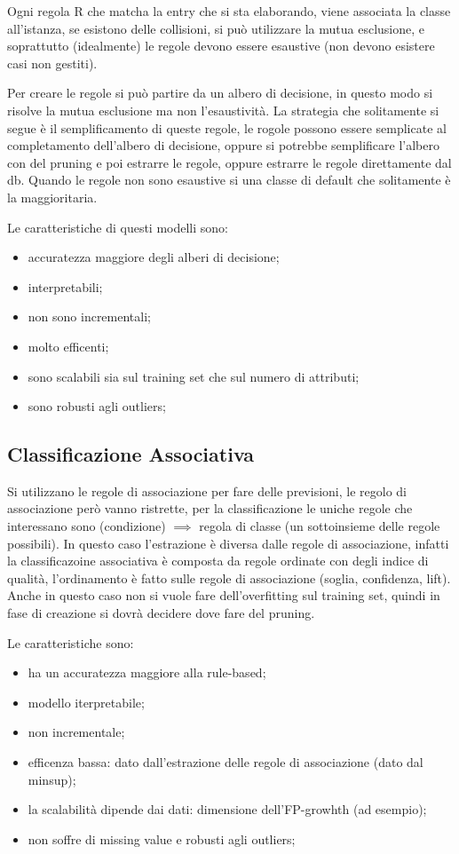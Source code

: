 \documentclass[12pt]{article}
\begin{document}
Ogni regola R che matcha la entry che si sta elaborando, viene associata la classe all'istanza, se esistono delle collisioni, si pu\`o utilizzare la mutua esclusione, e soprattutto (idealmente) le regole devono essere esaustive (non devono esistere casi non gestiti).

Per creare le regole si pu\`o partire da un albero di decisione, in questo modo si risolve la mutua esclusione ma non l'esaustivit\`a. La strategia che solitamente si segue \`e il semplificamento di queste regole, le rogole possono essere semplicate al completamento dell'albero di decisione, oppure si potrebbe semplificare l'albero con del pruning e poi estrarre le regole, oppure estrarre  le regole direttamente dal db. Quando le regole non sono esaustive si una classe di default che solitamente \`e la maggioritaria.

Le caratteristiche di questi modelli sono:
\begin{itemize}
    \item accuratezza maggiore degli alberi di decisione;
    \item interpretabili;
    \item non sono incrementali;
    \item molto efficenti;
    \item sono scalabili sia sul training set che sul numero di attributi;
    \item sono robusti agli outliers;
\end{itemize}


\subsection{Classificazione Associativa}
Si utilizzano le regole di associazione per fare delle previsioni, le regolo di associazione per\`o vanno ristrette, per la classificazione le uniche regole che interessano sono (condizione) $ \implies $ regola di classe (un sottoinsieme delle regole possibili). In questo caso l'estrazione \`e diversa dalle regole di associazione, infatti la classificazoine associativa \`e composta da regole ordinate con degli indice di qualit\`a, l'ordinamento \`e fatto sulle regole di associazione (soglia, confidenza, lift). Anche in questo caso non si vuole fare dell'overfitting sul training set, quindi in fase di creazione si dovr\`a decidere dove fare del pruning.

Le caratteristiche sono:
\begin{itemize}
    \item ha un accuratezza maggiore alla rule-based;
    \item modello iterpretabile;
    \item non incrementale;
    \item efficenza bassa: dato dall'estrazione delle regole di associazione (dato dal minsup);
    \item la scalabilit\`a dipende dai dati: dimensione dell'FP-growhth (ad esempio);
    \item non soffre di missing value e robusti agli outliers;
\end{itemize}
\end{document}
